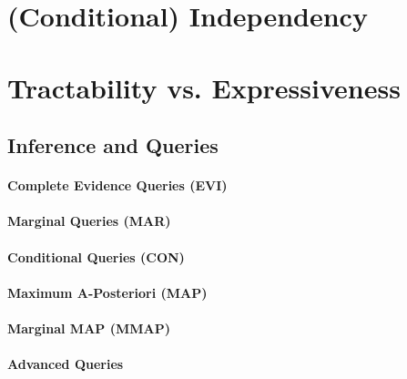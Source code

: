 	\section{(Conditional) Independency} %

	\section{Tractability vs. Expressiveness} %

		\subsection{Inference and Queries} %

			\paragraph{Complete Evidence Queries (EVI)} %

			\paragraph{Marginal Queries (MAR)} %

			\paragraph{Conditional Queries (CON)} %

			\paragraph{Maximum A-Posteriori (MAP)} %

			\paragraph{Marginal MAP (MMAP)} %

			\paragraph{Advanced Queries} %

